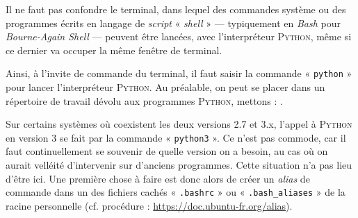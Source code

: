 Il ne faut pas confondre le terminal, dans lequel des commandes système ou des programmes écrits en langage de \textit{script} « \textit{shell} » --- typiquement en \textit{Bash} pour \textit{Bourne-Again Shell} --- peuvent être lancées, avec l'interpréteur \textsc{Python}, même si ce dernier va occuper la même fenêtre de terminal.

Ainsi, à l'invite de commande du terminal, il faut saisir la commande « \texttt{python} » pour lancer l'interpréteur \textsc{Python}. Au préalable, on peut se placer dans un répertoire de travail dévolu aux programmes \textsc{Python}, mettons : . 

Sur certains systèmes où coexistent les deux versions 2.7 et 3.x, l'appel à \textsc{Python} en version 3 se fait par la commande « \texttt{python3} ». Ce n'est pas commode, car il faut continuellement se souvenir de quelle version on a besoin, au cas où on aurait velléité d'intervenir sur d'anciens programmes. Cette situation n'a pas lieu d'être ici. Une première chose à faire est donc alors de créer un \textit{alias} de commande dans un des fichiers cachés « \texttt{.bashrc} » ou « \texttt{.bash\_aliases} » de la racine personnelle (cf. procédure : \url{https://doc.ubuntu-fr.org/alias}).



